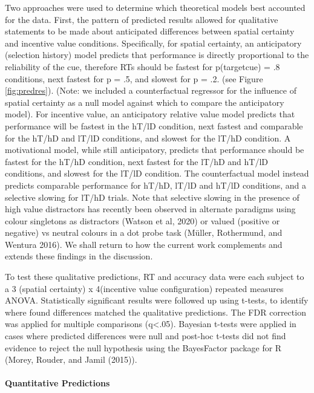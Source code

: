 \documentclass[11pt,halfline,a4paper,]{ouparticle}
\begin{document}
Two approaches were used to determine which theoretical models best accounted for the data. First, the pattern of predicted results allowed for qualitative statements to be made about anticipated differences between spatial certainty and incentive value conditions. Specifically, for spatial certainty, an anticipatory (selection history) model predicts that performance is directly proportional to the reliability of the cue, therefore RTs should be fastest for p(target\textbar cue) = .8 conditions, next fastest for p = .5, and slowest for p = .2. (see Figure \ref{fig:predres}). (Note: we included a counterfactual regressor for the influence of spatial certainty as a null model against which to compare the anticipatory model). For incentive value, an anticipatory relative value model predicts that performance will be fastest in the hT/lD condition, next fastest and comparable for the hT/hD and lT/lD conditions, and slowest for the lT/hD condition. A motivational model, while still anticipatory, predicts that performance should be fastest for the hT/hD condition, next fastest for the lT/hD and hT/lD conditions, and slowest for the lT/lD condition. The counterfactual model instead predicts comparable performance for hT/hD, lT/lD and hT/lD conditions, and a selective slowing for lT/hD trials. Note that selective slowing in the presence of high value distractors has recently been observed in alternate paradigms using colour singletons as distractors (Watson et al, 2020) or valued (positive or negative) vs neutral colours in a dot probe task (Müller, Rothermund, and Wentura 2016). We shall return to how the current work complements and extends these findings in the discussion.

To test these qualitative predictions, RT and accuracy data were each subject to a 3 (spatial certainty) x 4(incentive value configuration) repeated measures ANOVA. Statistically significant results were followed up using t-tests, to identify where found differences matched the qualitative predictions. The FDR correction was applied for multiple comparisons (q\textless.05). Bayesian t-tests were applied in cases where predicted differences were null and post-hoc t-tests did not find evidence to reject the null hypothesis using the BayesFactor package for R (Morey, Rouder, and Jamil (2015)).

\hypertarget{quantitative-predictions}{%
\paragraph{Quantitative Predictions}\label{quantitative-predictions}}
\end{document}
